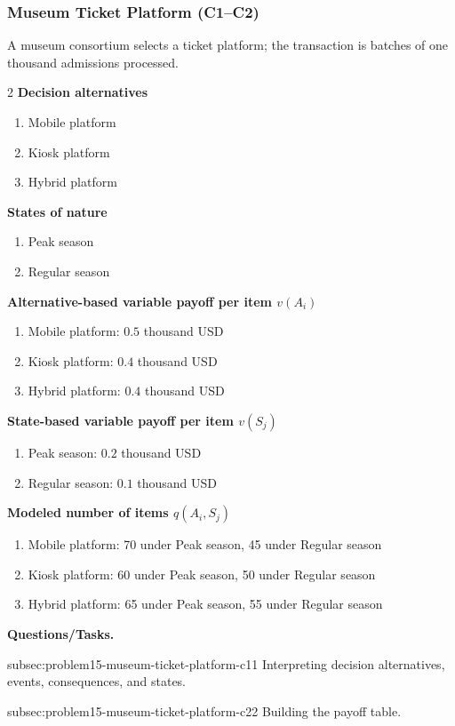 	\subsubsection{Museum Ticket Platform (C1--C2)}
	\label{sec:problem15-museum-ticket-platform-c1-c2}
	A museum consortium selects a ticket platform; the transaction is batches of one thousand admissions processed.
	\begin{multicols}{2}
	\textbf{Decision alternatives}
	\begin{enumerate}[label=\arabic*.]
\item Mobile platform
\item Kiosk platform
\item Hybrid platform
	\end{enumerate}
	\textbf{States of nature}
	\begin{enumerate}[label=\arabic*.]
\item Peak season
\item Regular season
	\end{enumerate}
	\columnbreak
	\textbf{Alternative-based variable payoff per item $v(A_i)$}
\begin{enumerate}[label=\arabic*.]
\item Mobile platform: $0.5$ thousand USD
\item Kiosk platform: $0.4$ thousand USD
\item Hybrid platform: $0.4$ thousand USD\end{enumerate}
\textbf{State-based variable payoff per item $v(S_j)$}
\begin{enumerate}[label=\arabic*.]
\item Peak season: $0.2$ thousand USD
\item Regular season: $0.1$ thousand USD\end{enumerate}
\textbf{Modeled number of items $q(A_i,S_j)$}
\begin{enumerate}[label=\arabic*.]
\item Mobile platform: 70 under Peak season, 45 under Regular season
\item Kiosk platform: 60 under Peak season, 50 under Regular season
\item Hybrid platform: 65 under Peak season, 55 under Regular season
\end{enumerate}
	\end{multicols}

	\textbf{Questions/Tasks.}
	\begin{enumerate}
	\CriterionTask
	{subsec:problem15-museum-ticket-platform-c1}{1}
	{Interpreting decision alternatives, events, consequences, and states.}

	\CriterionTask
	{subsec:problem15-museum-ticket-platform-c2}{2}
	{Building the payoff table.}
	\end{enumerate}

